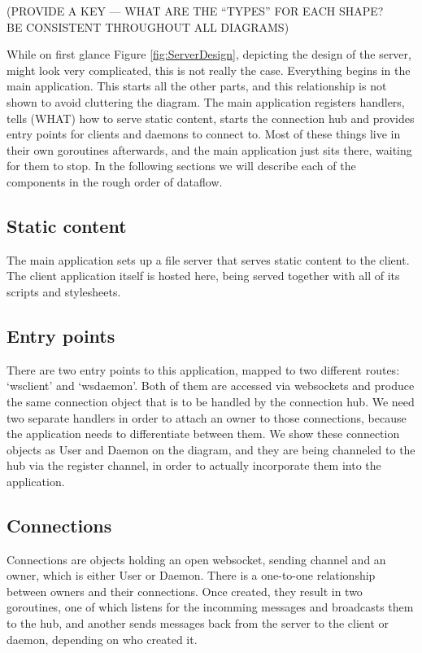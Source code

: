 \documentclass{l3proj}
\begin{document}
(PROVIDE A KEY --- WHAT ARE THE ``TYPES'' FOR EACH SHAPE?\\BE CONSISTENT THROUGHOUT ALL DIAGRAMS)

While on first glance Figure \ref{fig:ServerDesign}, depicting the design of the server, might look very complicated, this is not really the case. Everything begins in the main application. This starts all the other parts, and this relationship is not shown to avoid cluttering the diagram. The main application registers handlers, tells (WHAT) how to serve static content, starts the connection hub and provides entry points for clients and daemons to connect to. Most of these things live in their own goroutines afterwards, and the main application just sits there, waiting for them to stop. In the following sections we will describe each of the components in the rough order of dataflow.

\subsection{Static content}

The main application sets up a file server that serves static content to the client. The client application itself is hosted here, being served together with all of its scripts and stylesheets.

\subsection{Entry points}

There are two entry points to this application, mapped to two different routes: `wsclient' and `wsdaemon'. Both of them are accessed via websockets and produce the same connection object that is to be handled by the connection hub. We need two separate handlers in order to attach an owner to those connections, because the application needs to differentiate between them. We show these connection objects as User and Daemon on the diagram, and they are being channeled to the hub via the register channel, in order to actually incorporate them into the application.

\subsection{Connections}

Connections are objects holding an open websocket, sending channel and an owner, which is either User or Daemon. There is a one-to-one relationship between owners and their connections. Once created, they result in two goroutines, one of which listens for the incomming messages and broadcasts them to the hub, and another sends messages back from the server to the client or daemon, depending on who created it.
\end{document}
